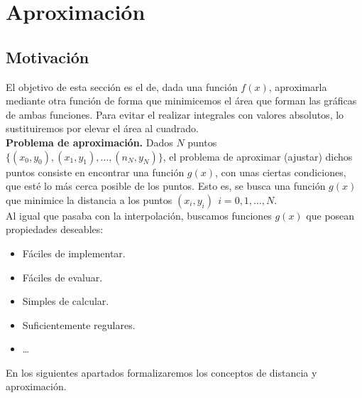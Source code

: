 \chapter{Aproximación}
\section{Motivación}
\noindent
El objetivo de esta sección es el de, dada una función $f(x)$, aproximarla mediante otra función de forma
que minimicemos el área que forman las gráficas de ambas funciones. Para evitar el realizar integrales con
valores absolutos, lo sustituiremos por elevar el área al cuadrado.\\

\noindent
\textbf{Problema de aproximación.} Dados $N$ puntos $\{(x_0, y_0), (x_1, y_1), \ldots, (n_N, y_N)\}$, el problema de aproximar
(ajustar) dichos puntos consiste en encontrar una función $g(x)$, con unas ciertas condiciones, que esté lo más cerca posible
de los puntos.\newline
Esto es, se busca una función $g(x)$ que minimice la distancia a los puntos $(x_i,y_i)~~i=0,1,\ldots, N$.\\

\noindent
Al igual que pasaba con la interpolación, buscamos funciones $g(x)$ que posean propiedades deseables:
\begin{itemize}
    \item Fáciles de implementar.
    \item Fáciles de evaluar.
    \item Simples de calcular.
    \item Suficientemente regulares.
    \item \ldots
\end{itemize}

\noindent
En los siguientes apartados formalizaremos los conceptos de distancia y aproximación.

